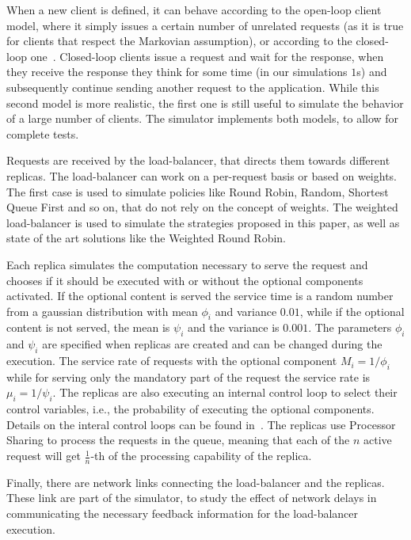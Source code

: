 When a new client is defined, it can behave according to the open-loop
client model, where it simply issues a certain number of unrelated
requests (as it is true for clients that respect the Markovian
assumption), or according to the closed-loop
one~\cite{openvsclosed,openandclosed2}. Closed-loop clients issue a
request and wait for the response, when they receive the response they
think for some time (in our simulations $1$s) and subsequently
continue sending another request to the application. While this second
model is more realistic, the first one is still useful to simulate the
behavior of a large number of clients. The simulator implements both
models, to allow for complete tests.

Requests are received by the load-balancer, that directs them towards
different replicas. The load-balancer can work on a per-request basis
or based on weights. The first case is used to simulate policies like
Round Robin, Random, Shortest Queue First and so on, that do not rely
on the concept of weights. The weighted load-balancer is used to
simulate the strategies proposed in this paper, as well as state of
the art solutions like the Weighted Round Robin.

Each replica simulates the computation necessary to serve the request
and chooses if it should be executed with or without the optional
components activated. If the optional content is served the service
time is a random number from a gaussian distribution with mean
$\phi_i$ and variance $0.01$, while if the optional content is not
served, the mean is $\psi_i$ and the variance is $0.001$. The
parameters $\phi_i$ and $\psi_i$ are specified when replicas are
created and can be changed during the execution. The service rate of
requests with the optional component $M_i = 1/\phi_i$ while for
serving only the mandatory part of the request the service rate is
$\mu_i = 1/\psi_i$. The replicas are also executing an internal
control loop to select their control variables, i.e., the probability
of executing the optional components. Details on the interal control
loops can be found in~\cite{cloudish-tr}. The replicas use Processor
Sharing to process the requests in the queue, meaning that each of the
$n$ active request will get $\frac{1}{n}$-th of the processing
capability of the replica.

Finally, there are network links connecting the load-balancer and the
replicas. These link are part of the simulator, to study the effect of
network delays in communicating the necessary feedback information for
the load-balancer execution.

